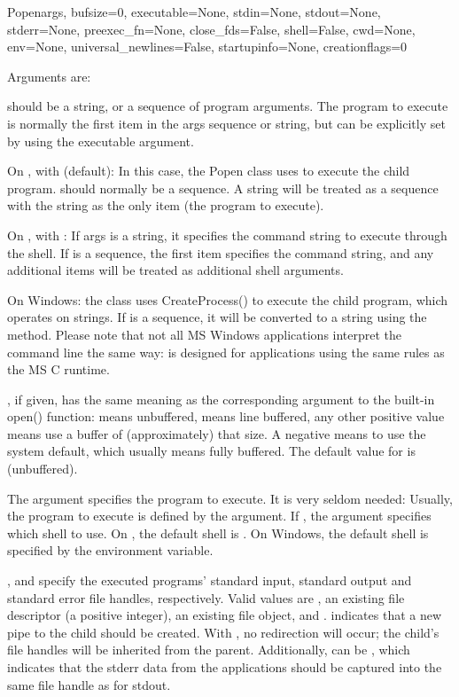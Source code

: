 \begin{classdesc}{Popen}{args, bufsize=0, executable=None,
            stdin=None, stdout=None, stderr=None,
            preexec_fn=None, close_fds=False, shell=False,
            cwd=None, env=None, universal_newlines=False,
            startupinfo=None, creationflags=0}

Arguments are:

 should be a string, or a sequence of program arguments.  The
program to execute is normally the first item in the args sequence or
string, but can be explicitly set by using the executable argument.

On \UNIX{}, with  (default): In this case, the Popen
class uses  to execute the child program.
 should normally be a sequence.  A string will be treated as a
sequence with the string as the only item (the program to execute).

On \UNIX{}, with : If args is a string, it specifies the
command string to execute through the shell.  If  is a
sequence, the first item specifies the command string, and any
additional items will be treated as additional shell arguments.

On Windows: the  class uses CreateProcess() to execute
the child program, which operates on strings.  If  is a
sequence, it will be converted to a string using the
 method.  Please note that not all MS Windows
applications interpret the command line the same way:
 is designed for applications using the same
rules as the MS C runtime.

, if given, has the same meaning as the corresponding
argument to the built-in open() function:  means unbuffered,
 means line buffered, any other positive value means use a
buffer of (approximately) that size.  A negative  means to
use the system default, which usually means fully buffered.  The default
value for  is  (unbuffered).

The  argument specifies the program to execute. It is
very seldom needed: Usually, the program to execute is defined by the
 argument. If , the 
argument specifies which shell to use. On \UNIX{}, the default shell
is .  On Windows, the default shell is specified by the
 environment variable.

,  and  specify the executed
programs' standard input, standard output and standard error file
handles, respectively.  Valid values are , an existing file
descriptor (a positive integer), an existing file object, and
.   indicates that a new pipe to the child
should be created.  With , no redirection will occur; the
child's file handles will be inherited from the parent.  Additionally,
 can be , which indicates that the stderr
data from the applications should be captured into the same file
handle as for stdout.


\end{classdesc}
